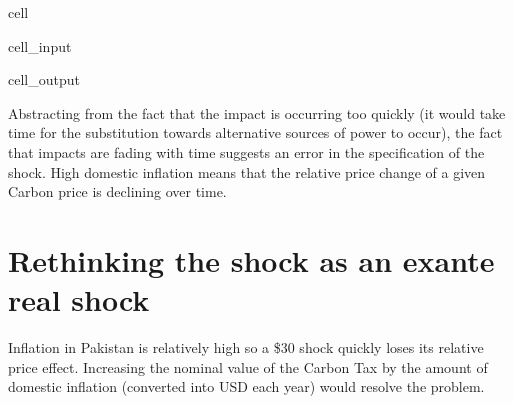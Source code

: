 \documentclass[letterpaper,10pt,english]{jupyterBook}
\begin{document}
\begin{sphinxuseclass}{cell}\begin{sphinxVerbatimInput}

\begin{sphinxuseclass}{cell_input}
\begin{sphinxVerbatim}[commandchars=\\\{\}]
\PYG{p}{[}\PYG{p}{]}
\end{sphinxVerbatim}

\end{sphinxuseclass}\end{sphinxVerbatimInput}
\begin{sphinxVerbatimOutput}

\begin{sphinxuseclass}{cell_output}
\noindent{}

\end{sphinxuseclass}\end{sphinxVerbatimOutput}

\end{sphinxuseclass}
\sphinxAtStartPar
Abstracting from the fact that the impact is occurring too quickly (it would take time for the substitution towards alternative sources of power to occur), the fact that impacts are fading with time suggests an error in the specification of the shock.  High domestic inflation means that the relative price change of a given Carbon price is declining over time.


\section{Re\sphinxhyphen{}thinking the shock as an ex\sphinxhyphen{}ante real shock}
\label{\detokenize{content/05_WBModels/MoreComplexScenarios:re-thinking-the-shock-as-an-ex-ante-real-shock}}
\sphinxAtStartPar
Inflation in Pakistan is relatively high so a \$30 shock quickly loses its relative price effect. Increasing the nominal value of the Carbon Tax by the amount of domestic inflation (converted into USD each year) would resolve the problem.
\end{document}
